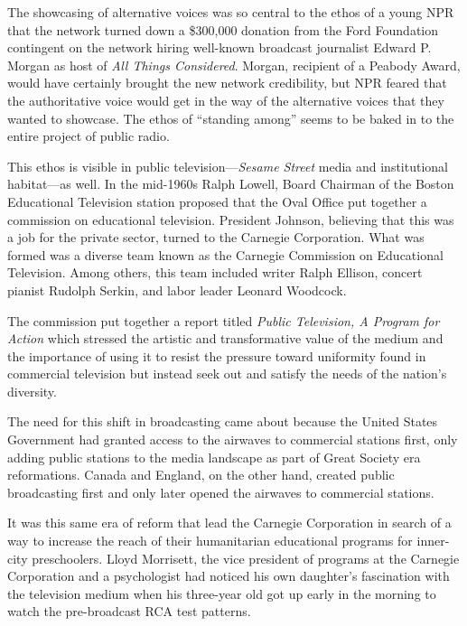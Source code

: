 \documentclass[12pt,letterpaper]{article}
\newcommand{\ses}{\textit{Sesame Street }}
\begin{document}
	The showcasing of alternative voices was so central to the ethos of a 
	young NPR that the network turned down a \$300,000 donation from 
	the Ford 
	Foundation contingent on the network hiring well-known broadcast
	journalist Edward P. Morgan as host of \textit{All Things Considered}. 
	Morgan, recipient of a Peabody Award, would have certainly 
	brought the new network
	credibility, but NPR feared that the authoritative voice would
	get in the way of the alternative voices that they wanted to showcase.
	The ethos of ``standing among'' seems to be baked in to the entire
	project of public radio.

	This ethos is visible in public television---\ses media and 
	institutional habitat---as well. In the mid-1960s
	Ralph Lowell, Board Chairman of the Boston Educational Television 
	station proposed that the Oval Office put together a commission on 
	educational television. President Johnson, believing that this was
	a job for the private sector, turned to the Carnegie Corporation.
	What was formed was a diverse team known as the Carnegie Commission
	on Educational Television. Among others, this team included writer Ralph
	Ellison, concert pianist Rudolph Serkin, and labor leader Leonard 
	Woodcock.\autocite[409]{Meany}

	The commission put together a report titled \textit{Public Television, A 
	Program for Action} which stressed the artistic and transformative value
	of the medium and the importance of using it to resist the pressure 
	toward uniformity found in commercial television but instead seek out 
	and satisfy the needs of the nation's diversity.\autocite[410]{Meany}

	The need for this shift in broadcasting came about because the
	United States Government had granted access to the airwaves to 
	commercial stations
	first, only adding public stations to the media landscape as part of
	Great Society era reformations. Canada and England, on the other
	hand, created public broadcasting first and only later opened the
	airwaves to commercial stations.\autocite[412]{Meany}

	It was this same era of reform that lead the Carnegie Corporation
	in search of a way to increase the reach of their 
	humanitarian educational programs for inner-city preschoolers.
	\autocite[15]{Davis} Lloyd Morrisett, the vice president of programs at
	the Carnegie Corporation\autocite[7]{Cooney} and a psychologist
	\autocite[15]{Davis} had noticed his own daughter's fascination with
	the television medium when his three-year old got up early in the 
	morning to watch the pre-broadcast RCA test patterns.
	\autocite[11]{Davis}
	
\end{document}
